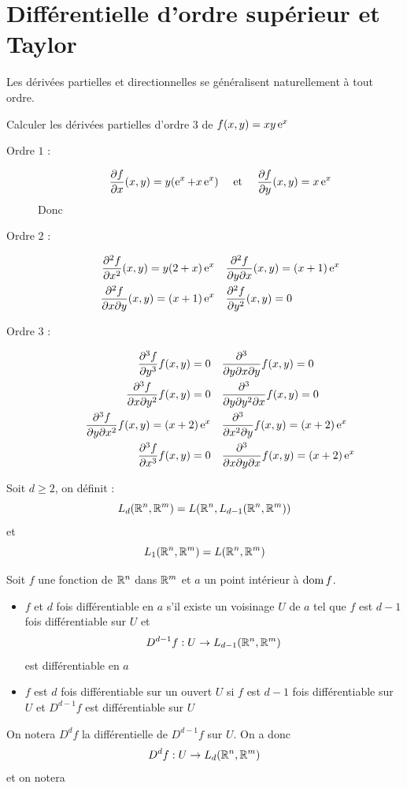   \section{Différentielle d'ordre supérieur et Taylor}
    Les dérivées partielles et directionnelles se généralisent naturellement à tout ordre.
    \begin{exemple}
        Calculer les dérivées partielles d'ordre $3$ de $f(x,y) = xy\operatorname{e}^x$
        \begin{description}
            \item[Ordre $1$ :]$$\frac{\partial f}{\partial x}(x,y)=y(\operatorname{e}^x+x\operatorname{e}^x)\quad \text{ et }\quad \frac{\partial f}{\partial y}(x,y)=x\operatorname{e}^x$$ Donc
    \item[Ordre $2$ :] \begin{align*}
        \frac{\partial ^2f}{\partial x^2}(x,y) =  y(2+x) \operatorname{e}^x \quad& \frac{\partial ^2f}{\partial y\partial x}(x,y) = (x+1)\operatorname{e}^x\\
        \frac{\partial ^2f}{\partial x\partial y}(x,y) = (x+1)\operatorname{e}^x\quad & \frac{\partial ^2f}{\partial y^2}(x,y) = 0
    \end{align*}
    \item[Ordre $3$ : ]\begin{align*}
        \frac{\partial ^3f}{\partial y^3}f(x,y) = 0 \quad & \frac{\partial ^3}{\partial y\partial x\partial y}f(x,y) = 0\\
        \frac{\partial ^3f}{\partial x\partial y ^2}f(x,y) = 0 \quad & \frac{\partial ^3}{\partial y\partial y^2\partial x}f(x,y) = 0\\
        \frac{\partial ^3f}{\partial y\partial x^2}f(x,y) = (x+2)\operatorname{e}^x \quad & \frac{\partial ^3}{\partial x^2\partial y}f(x,y) = (x+2)\operatorname{e}^x\\
        \frac{\partial ^3f}{\partial x^3}f(x,y) = 0 \quad & \frac{\partial ^3}{\partial x\partial y\partial x}f(x,y) = (x+2)\operatorname{e}^x\\
    \end{align*} 
        \end{description}
    \end{exemple}
    \begin{definition}
        Soit $d \ge 2$, on définit : $$L_d(\mathbb{R}^n , \mathbb{R}^m) = L(\mathbb{R}^n, L_{d-1}(\mathbb{R}^n, \mathbb{R}^m)) $$ et $$L_1(\mathbb{R}^n, \mathbb{R}^m) = L(\mathbb{R}^n, \mathbb{R}^m)$$
    \end{definition}
    \begin{definition}
        Soit $f$ une fonction de $\mathbb{R}^n$ dans $\mathbb{R}^m$ et $a$ un point intérieur à $\operatorname{dom} f$.
        \begin{itemize}
            \item $f$ et $d$ fois différentiable en $a$ s'il existe un voisinage $U$ de $a$ tel que $f$ est $d-1$ fois différentiable sur $U$ et $$
            D^{d-1}f : U\to L_{d-1}(\mathbb{R}^n,\mathbb{R}^m)$$ est différentiable en $a$
            \item $f$ est $d$ fois différentiable sur un ouvert $U$ si $f$ est $d-1$ fois différentiable sur $U$ et $D^{d-1}f$ est différentiable sur $U$
        \end{itemize}
        On notera $D^df$ la différentielle de $D^{d-1}f$ sur $U$. On a donc $$D^df: U\to L_d(\mathbb{R}^n,\mathbb{R}^m)$$  et on notera 
    \end{definition}
